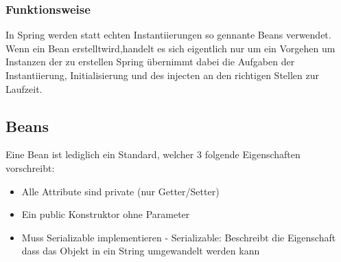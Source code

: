         \subsubsection{Funktionsweise}
            In Spring werden statt echten Instantiierungen so gennante Beans verwendet. Wenn ein Bean erstelltwird,handelt es sich eigentlich nur um ein Vorgehen um Instanzen der zu erstellen Spring übernimmt dabei die Aufgaben der Instantiierung, Initialisierung und des injecten an den richtigen Stellen zur Laufzeit.
            
    \subsection{Beans}
        Eine Bean ist lediglich ein Standard, welcher 3 folgende Eigenschaften vorschreibt:
        \begin{itemize}
            \item Alle Attribute sind private (nur Getter/Setter)
            \item Ein public Konstruktor ohne Parameter
            \item Muss Serializable implementieren
            \subitem  - Serializable: Beschreibt die Eigenschaft dass das Objekt in ein String umgewandelt werden kann
        \end{itemize}
    
